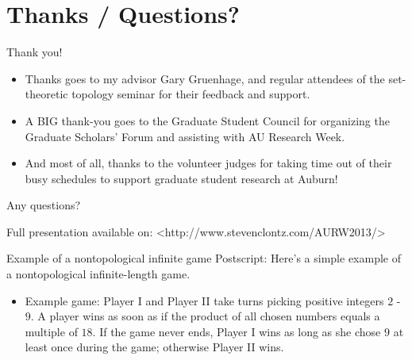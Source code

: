 \documentclass{beamer}
\begin{document}
\section{Thanks / Questions?}

\begin{frame}{Thank you!}
  \begin{itemize}
    \item Thanks goes to my advisor Gary Gruenhage, and regular attendees of the set-theoretic topology seminar for their feedback and support.
    \item A BIG thank-you goes to the Graduate Student Council for organizing the Graduate Scholars' Forum and assisting with AU Research Week.
    \item And most of all, thanks to the volunteer judges for taking time out of their busy schedules to support graduate student research at Auburn!
  \end{itemize}
Any questions?

{\tiny Full presentation available on: <http://www.stevenclontz.com/AURW2013/>}
\end{frame}
\begin{frame}\end{frame}






\begin{frame}{Example of a nontopological infinite game}
  Postscript: Here's a simple example of a nontopological infinite-length game.
  \begin{itemize}
  \item 
    Example game: Player I and Player II take turns picking positive integers $2$ - $9$. A player wins as soon as if the product of all chosen numbers equals a multiple of $18$. If the game never ends, Player I wins as long as she chose $9$ at least once during the game; otherwise Player II wins.
  \end{itemize}
\end{frame}
\end{document}
